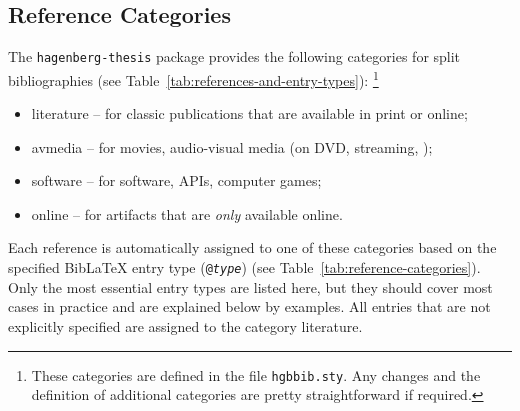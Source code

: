 \subsection{Reference Categories}
\label{sec:reference-categories}

The \texttt{hagenberg-thesis} package provides the following categories for split
bibliographies (see Table~\ref{tab:references-and-entry-types}):%
\footnote{These categories are defined in the file \nolinkurl{hgbbib.sty}. Any
changes and the definition of additional categories are pretty straightforward
if required.}
%
\begin{itemize}
    \item[] \textsf{literature} -- for classic publications that are available
    in print or online;
    \item[] \textsf{avmedia} -- for movies, audio-visual media (on DVD,
    streaming, \etc);
    \item[] \textsf{software} -- for software, APIs, computer games;
    \item[] \textsf{online} -- for artifacts that are \emph{only} available
    online.
\end{itemize}
%
Each reference is automatically assigned to one of these categories based on the
specified BibLaTeX entry type (\texttt{@\emph{type}}) (see
Table~\ref{tab:reference-categories}). Only the most essential entry types are
listed here, but they should cover most cases in practice and are explained
below by examples. All entries that are not explicitly specified are assigned to
the category \textsf{literature}.



